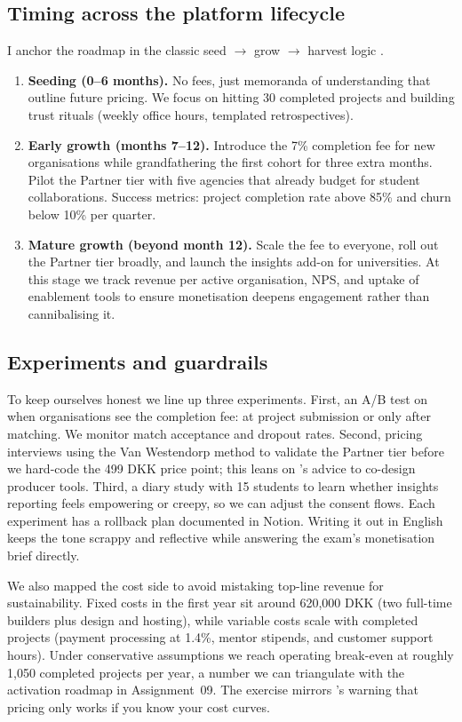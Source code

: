 \subsection*{Timing across the platform lifecycle}
I anchor the roadmap in the classic seed $\rightarrow$ grow $\rightarrow$ harvest logic \citep{Choudary2016}.
\begin{enumerate}
  \item \textbf{Seeding (0--6 months).} No fees, just memoranda of understanding that outline future pricing. We focus on hitting 30 completed projects and building trust rituals (weekly office hours, templated retrospectives).
  \item \textbf{Early growth (months 7--12).} Introduce the 7\% completion fee for new organisations while grandfathering the first cohort for three extra months. Pilot the Partner tier with five agencies that already budget for student collaborations. Success metrics: project completion rate above 85\% and churn below 10\% per quarter.
  \item \textbf{Mature growth (beyond month 12).} Scale the fee to everyone, roll out the Partner tier broadly, and launch the insights add-on for universities. At this stage we track revenue per active organisation, NPS, and uptake of enablement tools to ensure monetisation deepens engagement rather than cannibalising it.
\end{enumerate}

\subsection*{Experiments and guardrails}
To keep ourselves honest we line up three experiments. First, an A/B test on when organisations see the completion fee: at project submission or only after matching. We monitor match acceptance and dropout rates. Second, pricing interviews using the Van Westendorp method to validate the Partner tier before we hard-code the 499 DKK price point; this leans on \citet{Reillier2017}'s advice to co-design producer tools. Third, a diary study with 15 students to learn whether insights reporting feels empowering or creepy, so we can adjust the consent flows. Each experiment has a rollback plan documented in Notion. Writing it out in English keeps the tone scrappy and reflective while answering the exam's monetisation brief directly.

We also mapped the cost side to avoid mistaking top-line revenue for sustainability. Fixed costs in the first year sit around 620,000 DKK (two full-time builders plus design and hosting), while variable costs scale with completed projects (payment processing at 1.4\%, mentor stipends, and customer support hours). Under conservative assumptions we reach operating break-even at roughly 1,050 completed projects per year, a number we can triangulate with the activation roadmap in Assignment~09. The exercise mirrors \citet{ShapiroVarian1999}'s warning that pricing only works if you know your cost curves.

